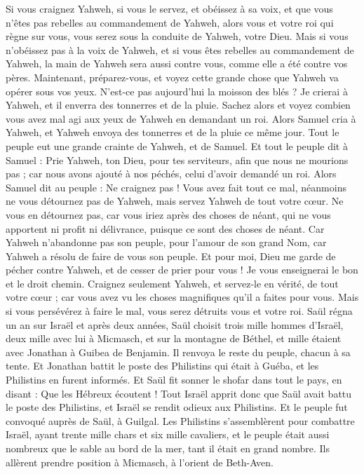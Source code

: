 \begin{multicols}{2}
Si vous craignez Yahweh, si vous le servez, et obéissez à sa voix, et que vous n’êtes pas rebelles au commandement de Yahweh, alors vous et votre roi qui règne sur vous, vous serez sous la conduite de Yahweh, votre Dieu.
Mais si vous n'obéissez pas à la voix de Yahweh, et si vous êtes rebelles au commandement de Yahweh, la main de Yahweh sera aussi contre vous, comme elle a été contre vos pères.
Maintenant, préparez-vous, et voyez cette grande chose que Yahweh va opérer sous vos yeux.
N'est-ce pas aujourd'hui la moisson des blés ? Je crierai à Yahweh, et il enverra des tonnerres et de la pluie. Sachez alors et voyez combien vous avez mal agi aux yeux de Yahweh en demandant un roi.
Alors Samuel cria à Yahweh, et Yahweh envoya des tonnerres et de la pluie ce même jour. Tout le peuple eut une grande crainte de Yahweh, et de Samuel.
Et tout le peuple dit à Samuel : Prie Yahweh, ton Dieu, pour tes serviteurs, afin que nous ne mourions pas ; car nous avons ajouté à nos péchés, celui d'avoir demandé un roi.
Alors Samuel dit au peuple : Ne craignez pas ! Vous avez fait tout ce mal, néanmoins ne vous détournez pas de Yahweh, mais servez Yahweh de tout votre cœur.
Ne vous en détournez pas, car vous iriez après des choses de néant, qui ne vous apportent ni profit ni délivrance, puisque ce sont des choses de néant.
Car Yahweh n’abandonne pas son peuple, pour l'amour de son grand Nom, car Yahweh a résolu de faire de vous son peuple.
Et pour moi, Dieu me garde de pécher contre Yahweh, et de cesser de prier pour vous ! Je vous enseignerai le bon et le droit chemin.
Craignez seulement Yahweh, et servez-le en vérité, de tout votre cœur ; car vous avez vu les choses magnifiques qu'il a faites pour vous.
Mais si vous persévérez à faire le mal, vous serez détruits vous et votre roi.
\VerseOne{}Saül régna un an sur Israël et après deux années,
Saül choisit trois mille hommes d'Israël, deux mille avec lui à Micmasch, et sur la montagne de Béthel, et mille étaient avec Jonathan à Guibea de Benjamin. Il renvoya le reste du peuple, chacun à sa tente.
Et Jonathan battit le poste des Philistins qui était à Guéba, et les Philistins en furent informés. Et Saül fit sonner le shofar dans tout le pays, en disant : Que les Hébreux écoutent !
Tout Israël apprit donc que Saül avait battu le poste des Philistins, et Israël se rendit odieux aux Philistins. Et le peuple fut convoqué auprès de Saül, à Guilgal.
Les Philistins s'assemblèrent pour combattre Israël, ayant trente mille chars et six mille cavaliers, et le peuple était aussi nombreux que le sable au bord de la mer, tant il était en grand nombre. Ils allèrent prendre position à Micmasch, à l'orient de Beth-Aven.

\end{multicols}
